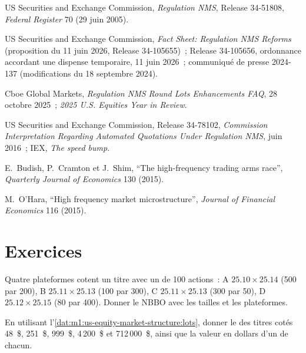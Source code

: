\begin{omsources}
\item US Securities and Exchange Commission, \emph{Regulation NMS}, Release
34-51808, \emph{Federal Register} 70 (29 juin 2005).
\item US Securities and Exchange Commission, \emph{Fact Sheet: Regulation NMS
Reforms} (proposition du 11 juin 2026, Release 34-105655)~; Release 34-105656,
ordonnance accordant une dispense temporaire, 11 juin 2026~; communiqué de presse
2024-137 (modifications du 18 septembre 2024).
\item Cboe Global Markets, \emph{Regulation NMS Round Lots Enhancements FAQ},
28 octobre 2025~; \emph{2025 U.S. Equities Year in Review}.
\item US Securities and Exchange Commission, Release 34-78102,
\emph{Commission Interpretation Regarding Automated Quotations Under
Regulation NMS}, juin 2016~; IEX, \emph{The speed bump}.
\item E.~Budish, P.~Cramton et J.~Shim, ``The high-frequency trading arms
race'', \emph{Quarterly Journal of Economics} 130 (2015).
\item M.~O'Hara, ``High frequency market microstructure'', \emph{Journal of
Financial Economics} 116 (2015).
\end{omsources}

\section{Exercices}

\begin{exercise}[$\star$]\label{exo:m1:us-equity-market-structure:1}
Quatre plateformes cotent un titre avec un  de 100 actions~: A $25.10 \times 25.14$
(500 par 200), B $25.11 \times 25.13$ (100 par 300), C $25.11 \times 25.13$ (300
par 50), D $25.12 \times 25.15$ (80 par 400). Donner le NBBO avec les tailles et
les plateformes.
\end{exercise}

\begin{exercise}[$\star$]\label{exo:m1:us-equity-market-structure:2}
En utilisant l'\cref{dat:m1:us-equity-market-structure:lots}, donner le  des
titres cotés 48~\$, 251~\$, 999~\$, 4\,200~\$ et 712\,000~\$, ainsi que la valeur en dollars d'un
 de chacun.
\end{exercise}

